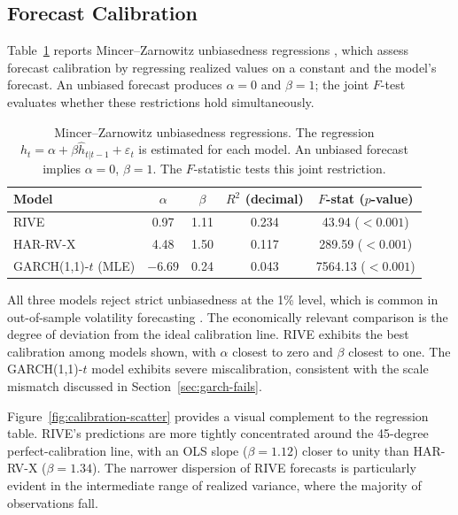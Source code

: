 \documentclass[review]{elsarticle}
\begin{document}
\subsection{Forecast Calibration}\label{sec:calibration}

Table~\ref{tab:mz-regression} reports Mincer--Zarnowitz unbiasedness regressions \cite{mincer1969}, which assess forecast calibration by regressing realized values on a constant and the model's forecast. An unbiased forecast produces $\alpha = 0$ and $\beta = 1$; the joint $F$-test evaluates whether these restrictions hold simultaneously.

\begin{table}[H]
\centering
\caption{Mincer--Zarnowitz unbiasedness regressions. The regression $h_t = \alpha + \beta \widehat{h}_{t|t-1} + \varepsilon_t$ is estimated for each model. An unbiased forecast implies $\alpha = 0$, $\beta = 1$. The $F$-statistic tests this joint restriction.}
\label{tab:mz-regression}
\begin{tabular}{lcccc}
\toprule
Model & $\alpha$ & $\beta$ & $R^2$ (decimal) & $F$-stat ($p$-value) \\
\midrule
RIVE & 0.97 & 1.11 & 0.234 & 43.94 ($<0.001$) \\
HAR-RV-X & 4.48 & 1.50 & 0.117 & 289.59 ($<0.001$) \\
GARCH(1,1)-$t$ (MLE) & $-6.69$ & 0.24 & 0.043 & 7564.13 ($<0.001$) \\
\bottomrule
\end{tabular}
\end{table}

All three models reject strict unbiasedness at the 1\% level, which is common in out-of-sample volatility forecasting \cite{patton2011}. The economically relevant comparison is the degree of deviation from the ideal calibration line. RIVE exhibits the best calibration among models shown, with $\alpha$ closest to zero and $\beta$ closest to one. The GARCH(1,1)-$t$ model exhibits severe miscalibration, consistent with the scale mismatch discussed in Section~\ref{sec:garch-fails}.

Figure~\ref{fig:calibration-scatter} provides a visual complement to the regression table. RIVE's predictions are more tightly concentrated around the 45-degree perfect-calibration line, with an OLS slope ($\beta = 1.12$) closer to unity than HAR-RV-X ($\beta = 1.34$). The narrower dispersion of RIVE forecasts is particularly evident in the intermediate range of realized variance, where the majority of observations fall.
\end{document}
